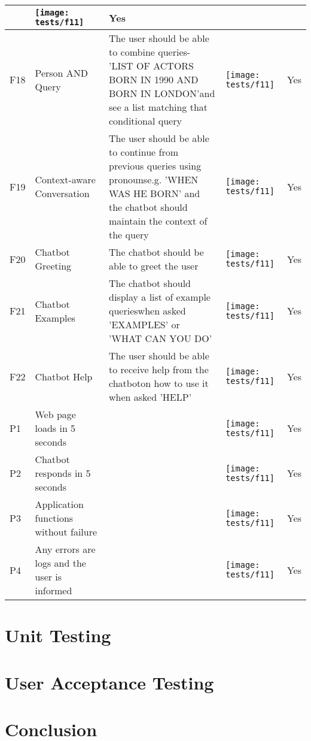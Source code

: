 \begin{landscape}
\begin{tabularx}{\hsize}{lXXXr}
		& \texttt{[image: tests/f11]} & Yes \\
		\bottomrule
		F18 & Person AND Query
		& The user should be able to combine queries\newline - 'LIST OF ACTORS BORN IN 1990 AND BORN IN LONDON'\newline and see a list matching that conditional query
		& \texttt{[image: tests/f11]} & Yes \\
		\bottomrule
		F19 & Context-aware Conversation
		& The user should be able to continue from previous queries using pronouns\newline e.g. 'WHEN WAS HE BORN' and the chatbot should maintain the context of the query
		& \texttt{[image: tests/f11]} & Yes \\
		\bottomrule
		F20 & Chatbot Greeting
		& The chatbot should be able to greet the user
		& \texttt{[image: tests/f11]} & Yes \\
		\bottomrule
		F21 & Chatbot Examples
		& The chatbot should display a list of example queries\newline when asked 'EXAMPLES' or 'WHAT CAN YOU DO'
		& \texttt{[image: tests/f11]} & Yes \\
		\bottomrule
		F22 & Chatbot Help
		& The user should be able to receive help from the chatbot\newline on how to use it when asked 'HELP'
		& \texttt{[image: tests/f11]} & Yes \\
		\bottomrule
		P1 & Web page loads in 5 seconds
		& 
		& \texttt{[image: tests/f11]} & Yes \\
		\bottomrule
		P2 & Chatbot responds in 5 seconds
		& 
		& \texttt{[image: tests/f11]} & Yes \\
		\bottomrule
		P3 & Application functions without failure
		& 
		& \texttt{[image: tests/f11]} & Yes \\
		\bottomrule
		P4 & Any errors are logs and the user is informed
		& 
		& \texttt{[image: tests/f11]} & Yes \\
		\bottomrule
	\end{tabularx}
\end{landscape}


\newpage
\section{Unit Testing}
\section{User Acceptance Testing}
\section{Conclusion}